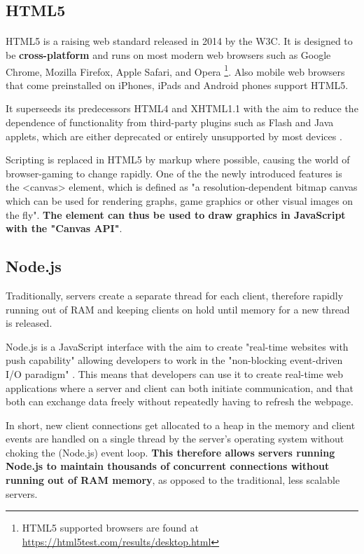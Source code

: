 \documentclass[bsc,frontabs,twoside,singlespacing,parskip,deptreport]{infthesis}     %
\begin{document}
\subsection{HTML5}
\paragraph{}HTML5 is a raising web standard released in 2014 by the W3C. It is designed to be \textbf{cross-platform} and runs on most modern web browsers such as Google Chrome, Mozilla Firefox, Apple Safari, and Opera \footnote{HTML5 supported browsers are found at \url{https://html5test.com/results/desktop.html}}. Also mobile web browsers that come preinstalled on iPhones, iPads and Android phones support HTML5.

It superseeds its predecessors HTML4 and XHTML1.1 with the aim to reduce the dependence of functionality from third-party plugins such as Flash and Java applets, which are either deprecated or entirely unsupported by most devices \cite{Death_Flash_Java}.

Scripting is replaced in HTML5 by markup where possible, causing the world of browser-gaming to change rapidly. One of the the newly introduced features is the <canvas> element, which is defined as "a resolution-dependent bitmap canvas which can be used for rendering graphs, game graphics or other visual images on the fly"\cite{HTML5_Up_and_Running}. \textbf{The element can thus be used to draw graphics in JavaScript with the "Canvas API"}\cite{Canvas_API}.

\subsection{Node.js}
Traditionally, servers create a separate thread for each client, therefore rapidly running out of RAM and keeping clients on hold until memory for a new thread is released\cite{Why_Nodejs}.

Node.js is a JavaScript interface with the aim to create "real-time websites with push capability" allowing developers to work in the "non-blocking event-driven I/O paradigm" \cite{Why_Nodejs}. This means that developers can use it to create real-time web applications where a server and client can both initiate communication, and that both can exchange data freely without repeatedly having to refresh the webpage.

In short, new client connections get allocated to a heap in the memory and client events are handled on a single thread by the server's operating system without choking the (Node.js) event loop. \textbf{This therefore allows servers running Node.js to maintain thousands of concurrent connections without running out of RAM memory}\cite{Node_Stress_Test}\cite{NodeJS_Image}, as opposed to the traditional, less scalable servers.
\end{document}
